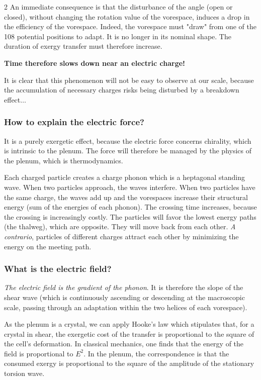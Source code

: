 \begin{multicols}{2}
	An immediate consequence is that the disturbance of the angle (open or 
	closed), without changing the rotation value of the vorespace, induces a 
	drop in the efficiency of the vorespace. Indeed, the vorespace must 
	"draw" from one of the 108 potential positions to adapt. It is no longer 
	in its nominal shape. The duration of exergy transfer must therefore 
	increase.
	
	\textbf{Time therefore slows down near an electric charge!}
	
	It is clear that this phenomenon will not be easy to observe at our 
	scale, because the accumulation of necessary charges risks being 
	disturbed by a breakdown effect$\dots$
	
	\subsubsection*{How to explain the electric force?}
	
	It is a purely exergetic effect, because the electric force concerns 
	chirality, which is intrinsic to the plenum. The force will therefore be 
	managed by the physics of the plenum, which is thermodynamics.
	
	Each charged particle creates a charge phonon which is a heptagonal 
	standing wave. When two particles approach, the waves interfere. When 
	two particles have the same charge, the waves add up and the vorespaces 
	increase their structural energy (sum of the energies of each phonon). 
	The crossing time increases, because the crossing is increasingly 
	costly. The particles will favor the lowest energy paths (the thalweg), 
	which are opposite. They will move back from each other. \textit{A 
		contrario}, particles of different charges attract each other by 
	minimizing the energy on the meeting path.
	
	\subsubsection*{What is the electric field?}
	
	\textit{The electric field is the gradient of the phonon}. It is therefore 
	the slope of the shear wave (which is continuously ascending or 
	descending at the macroscopic scale, passing through an adaptation 
	within the two helices of each vorespace).
	
	As the plenum is a crystal, we can apply Hooke's law which stipulates 
	that, for a crystal in shear, the exergetic cost of the transfer is 
	proportional to the square of the cell's deformation. In classical 
	mechanics, one finds that the energy of the field is proportional to 
	$E^2$. In the plenum, the correspondence is that the consumed exergy is 
	proportional to the square of the amplitude of the stationary torsion 
	wave.
	

\end{multicols}
